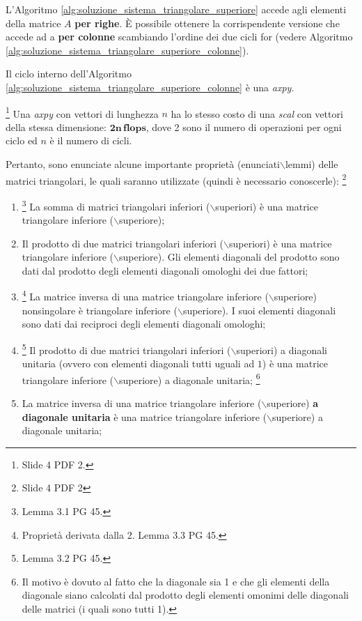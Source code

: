 L'Algoritmo \ref{alg:soluzione_sistema_triangolare_superiore} accede agli elementi della matrice $A$ \textbf{per righe}. È possibile ottenere la corrispendente versione che accede ad a \textbf{per colonne} scambiando l'ordine dei due cicli for (vedere Algoritmo \ref{alg:soluzione_sistema_triangolare_superiore_colonne}).

Il ciclo interno dell'Algoritmo \ref{alg:soluzione_sistema_triangolare_superiore_colonne} è una \textit{axpy}.

\begin{remark}\footnote{Slide 4 PDF 2.}
    Una \textit{axpy} con vettori di lunghezza $n$ ha lo stesso costo di una \textit{scal} con vettori della stessa dimensione: $\boldsymbol{2n\, flops}$, dove 2 sono il numero di operazioni per ogni ciclo ed $n$ è il numero di cicli.
\end{remark}

Pertanto, sono enunciate alcune importante proprietà (enunciati$\backslash$lemmi) delle matrici triangolari, le quali saranno utilizzate (quindi è necessario conoscerle): \footnote{Slide 4 PDF 2}
\begin{enumerate}
    \item \footnote{Lemma 3.1 PG 45.} La somma di matrici triangolari inferiori ($\backslash$superiori) è una matrice triangolare inferiore ($\backslash$superiore);
    \item Il prodotto di due matrici triangolari inferiori ($\backslash$superiori) è una matrice triangolare inferiore ($\backslash$superiore). Gli elementi diagonali del prodotto sono dati dal prodotto degli elementi diagonali omologhi dei due fattori;
    \item \footnote{Proprietà derivata dalla 2. Lemma 3.3 PG 45.} La matrice inversa di una matrice triangolare inferiore ($\backslash$superiore) \gls{nonsingolare} è triangolare inferiore ($\backslash$superiore). I suoi elementi diagonali sono dati dai reciproci degli elementi diagonali omologhi;
    \item  \footnote{Lemma 3.2 PG 45.} Il prodotto di due matrici triangolari inferiori ($\backslash$superiori) a diagonali unitaria (ovvero con elementi diagonali tutti uguali ad $1$) è una matrice triangolare inferiore ($\backslash$superiore) a diagonale unitaria; \footnote{Il motivo è dovuto al fatto che la diagonale sia 1 e che gli elementi della diagonale siano calcolati dal prodotto degli elementi omonimi delle diagonali delle matrici (i quali sono tutti 1).}
    \item La matrice inversa di una matrice triangolare inferiore ($\backslash$superiore) \textbf{a diagonale unitaria} è una matrice triangolare inferiore ($\backslash$superiore) a diagonale unitaria;
\end{enumerate}

